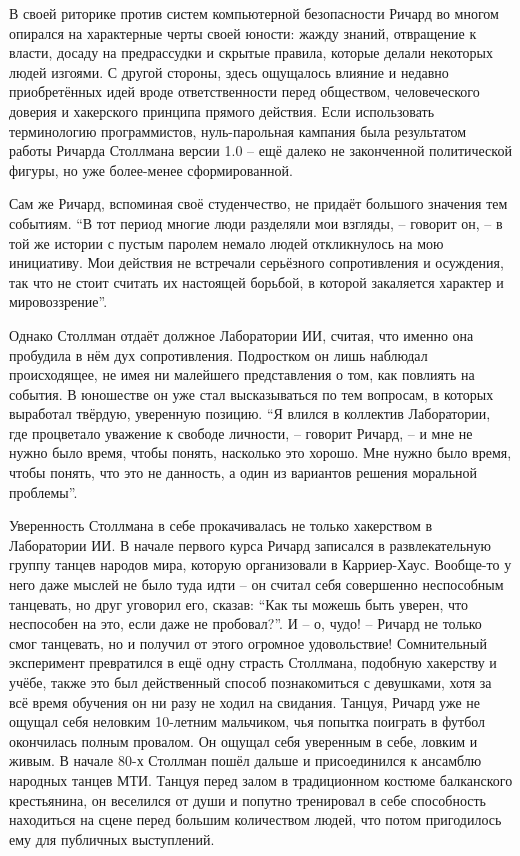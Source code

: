 В своей риторике против систем компьютерной безопасности Ричард во многом опирался на характерные черты своей юности: жажду знаний, отвращение к власти, досаду на предрассудки и скрытые правила, которые делали некоторых людей изгоями. С другой стороны, здесь ощущалось влияние и недавно приобретённых идей вроде ответственности перед обществом, человеческого доверия и хакерского принципа прямого действия. Если использовать терминологию программистов, нуль-парольная кампания была результатом работы Ричарда Столлмана версии 1.0 -- ещё далеко не законченной политической фигуры, но уже более-менее сформированной.

Сам же Ричард, вспоминая своё студенчество, не придаёт большого значения тем событиям. \enquote{В тот период многие люди разделяли мои взгляды, -- говорит он, -- в той же истории с пустым паролем немало людей откликнулось на мою инициативу. Мои действия не встречали серьёзного сопротивления и осуждения, так что не стоит считать их настоящей борьбой, в которой закаляется характер и мировоззрение}.

Однако Столлман отдаёт должное Лаборатории ИИ, считая, что именно она пробудила в нём дух сопротивления. Подростком он лишь наблюдал происходящее, не имея ни малейшего представления о том, как повлиять на события. В юношестве он уже стал высказываться по тем вопросам, в которых выработал твёрдую, уверенную позицию. \enquote{Я влился в коллектив Лаборатории, где процветало уважение к свободе личности, -- говорит Ричард, -- и мне не нужно было время, чтобы понять, насколько это хорошо. Мне нужно было время, чтобы понять, что это не данность, а один из вариантов решения моральной проблемы}.

Уверенность Столлмана в себе прокачивалась не только хакерством в Лаборатории ИИ. В начале первого курса Ричард записался в развлекательную группу танцев народов мира, которую организовали в Карриер-Хаус. Вообще-то у него даже мыслей не было туда идти -- он считал себя совершенно неспособным танцевать, но друг уговорил его, сказав: \enquote{Как ты можешь быть уверен, что неспособен на это, если даже не пробовал?}. И -- о, чудо! -- Ричард не только смог танцевать, но и получил от этого огромное удовольствие! Сомнительный эксперимент превратился в ещё одну страсть Столлмана, подобную хакерству и учёбе, также это был действенный способ познакомиться с девушками, хотя за всё время обучения он ни разу не ходил на свидания. Танцуя, Ричард уже не ощущал себя неловким 10-летним мальчиком, чья попытка поиграть в футбол окончилась полным провалом. Он ощущал себя уверенным в себе, ловким и живым. В начале 80-х Столлман пошёл дальше и присоединился к ансамблю народных танцев МТИ. Танцуя перед залом в традиционном костюме балканского крестьянина, он веселился от души и попутно тренировал в себе способность находиться на сцене  перед большим количеством людей, что потом пригодилось ему для публичных выступлений.

